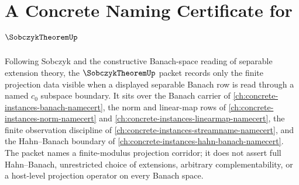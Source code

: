 \chapter{A Concrete Naming Certificate for $\SobczykTheoremUp$}
\label{ch:concrete-instances-sobczyk-theorem-namecert}

Following Sobczyk and the constructive Banach-space reading of separable extension theory, the $\SobczykTheoremUp$ packet records only the finite projection data visible when a displayed separable Banach row is read through a named $c_0$ subspace boundary. It sits over the Banach carrier of \autoref{ch:concrete-instances-banach-namecert}, the norm and linear-map rows of \autoref{ch:concrete-instances-norm-namecert} and \autoref{ch:concrete-instances-linearmap-namecert}, the finite observation discipline of \autoref{ch:concrete-instances-streamname-namecert}, and the Hahn--Banach boundary of \autoref{ch:concrete-instances-hahn-banach-namecert}. The packet names a finite-modulus projection corridor; it does not assert full Hahn--Banach, unrestricted choice of extensions, arbitrary complementability, or a host-level projection operator on every Banach space.

